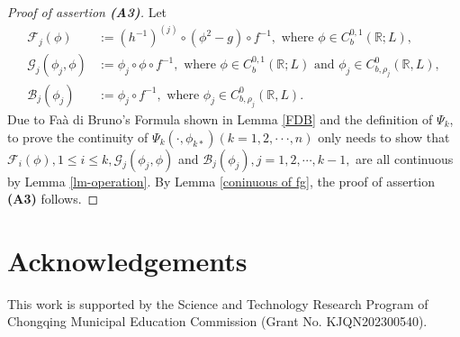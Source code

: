 \documentclass[11pt,reqno,a4paper]{amsart}
\numberwithin{equation}{section}
\begin{document}
\begin{proof}[Proof of assertion {\bf(A3)}]
Let
\begin{align*}
      \mathcal{F}_j(\phi) &:=(h^{-1})^{(j)}\circ (\phi^{2} -g) \circ f^{-1}, \text{ where } \phi \in C_b^{0,1}(\mathbb R;L),\\
         \mathcal{G}_j(\phi_j,\phi) &:=\phi_{j} \circ \phi \circ f^{-1},  \text{  where } \phi \in C_b^{0,1}(\mathbb R;L) \text{ and } \phi_j \in C_{b,\rho_j}^{0}(\mathbb{R},L),\\
           \mathcal{B}_j(\phi_j) &:= \phi_{j} \circ f^{-1}, \text{ where } \phi_j \in C_{b,\rho_j}^{0}(\mathbb{R},L).
\end{align*}
Due to Fa\`a di Bruno's Formula shown in Lemma \ref{FDB} and the definition of $\Psi_k$, to prove the continuity of $\Psi_k(\cdot, \phi_{k\ast})(k=1,2,\cdot \cdot \cdot,n)$ only needs to show that $\mathcal{F}_i(\phi), 1\le i\le k, \mathcal{G}_j(\phi_j,\phi)$ and $  \mathcal{B}_j(\phi_j), j=1,2,\cdots,k-1, $ are all continuous by Lemma \ref{lm-operation}. By Lemma \ref{coninuous of fg}, the proof  of assertion {\bf(A3)} follows.
\end{proof}




\section*{Acknowledgements}
This work is supported by the Science and Technology Research Program of Chongqing Municipal Education Commission (Grant No. KJQN202300540).
\end{document}
